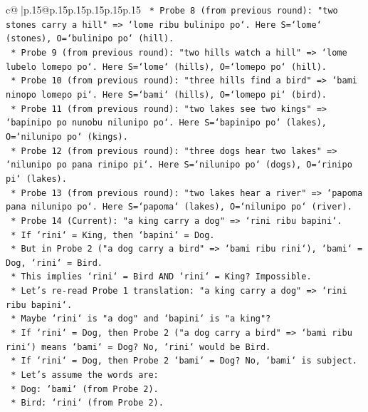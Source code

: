 \documentclass{article}
\begin{document}
{\begin{supertabular}{c@{$\;$}|p{.15\linewidth}@{}p{.15\linewidth}p{.15\linewidth}p{.15\linewidth}p{.15\linewidth}p{.15\linewidth}}
{{{\texttt{            *   Probe 8 (from previous round): "two stones carry a hill" => `lome ribu bulinipo po`. Here S=`lome` (stones), O=`bulinipo po` (hill).} \\
\texttt{            *   Probe 9 (from previous round): "two hills watch a hill" => `lome lubelo lomepo po`. Here S=`lome` (hills), O=`lomepo po` (hill).} \\
\texttt{            *   Probe 10 (from previous round): "three hills find a bird" => `bami ninopo lomepo pi`. Here S=`bami` (hills), O=`lomepo pi` (bird).} \\
\texttt{            *   Probe 11 (from previous round): "two lakes see two kings" => `bapinipo po nunobu nilunipo po`. Here S=`bapinipo po` (lakes), O=`nilunipo po` (kings).} \\
\texttt{            *   Probe 12 (from previous round): "three dogs hear two lakes" => `nilunipo po pana rinipo pi`. Here S=`nilunipo po` (dogs), O=`rinipo pi` (lakes).} \\
\texttt{            *   Probe 13 (from previous round): "two lakes hear a river" => `papoma pana nilunipo po`. Here S=`papoma` (lakes), O=`nilunipo po` (river).} \\
\texttt{            *   Probe 14 (Current): "a king carry a dog" => `rini ribu bapini`.} \\
\texttt{                *   If `rini` = King, then `bapini` = Dog.} \\
\texttt{                *   But in Probe 2 ("a dog carry a bird" => `bami ribu rini`), `bami` = Dog, `rini` = Bird.} \\
\texttt{                *   This implies `rini` = Bird AND `rini` = King? Impossible.} \\
\texttt{                *   Let's re{-}read Probe 1 translation: "a king carry a dog" => `rini ribu bapini`.} \\
\texttt{                *   Maybe `rini` is "a dog" and `bapini` is "a king"?} \\
\texttt{                    *   If `rini` = Dog, then Probe 2 ("a dog carry a bird" => `bami ribu rini`) means `bami` = Dog? No, `rini` would be Bird.} \\
\texttt{                    *   If `rini` = Dog, then Probe 2 `bami` = Dog? No, `bami` is subject.} \\
\texttt{                    *   Let's assume the words are:} \\
\texttt{                        *   Dog: `bami` (from Probe 2).} \\
\texttt{                        *   Bird: `rini` (from Probe 2).} \\
}}}
\end{supertabular}}
\end{document}
